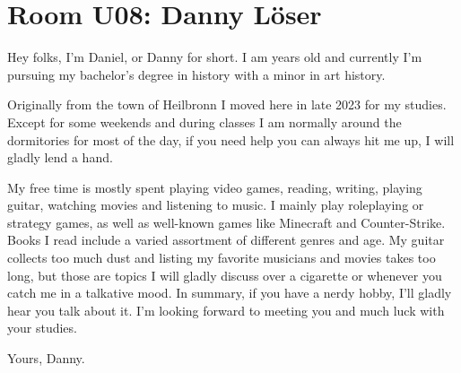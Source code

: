 \section{Room U08: Danny Löser} \label{sec:dannyL}
%
\FPsub\result{\theCurrentDate}{\theBirthdate}
\FPdiv{}
\FPtrunc{}

Hey folks, I’m Daniel, or Danny for short. I am \myage{} years old and currently I'm pursuing my bachelor’s degree in history with a minor in art history.

Originally from the town of Heilbronn I moved here in late 2023 for my studies. Except for some weekends and during classes I am normally around the dormitories for most of the day, if you need help you can always hit me up, I will gladly lend a hand.

My free time is mostly spent playing video games, reading, writing, playing guitar, watching movies and listening to music. I mainly play roleplaying or strategy games, as well as well-known games like Minecraft and Counter-Strike. Books I read include a varied assortment of different genres and age. My guitar collects too much dust and listing my favorite musicians and movies takes too long, but those are topics I will gladly discuss over a cigarette or whenever you catch me in a talkative mood. In summary, if you have a nerdy hobby, I’ll gladly hear you talk about it. I’m looking forward to meeting you and much luck with your studies.

Yours, Danny.